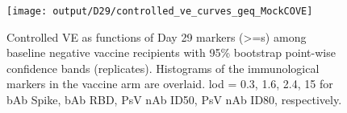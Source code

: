 \documentclass[
]{article}
\begin{document}
\begin{figure}[H]
    \centering
    \texttt{[image: output/D29/controlled\_ve\_curves\_geq\_MockCOVE]}
    \caption{Controlled VE as functions of Day 29 markers (>=s) among baseline negative vaccine recipients with 95\% bootstrap point-wise confidence bands (\protect replicates). Histograms of the immunological markers in the vaccine arm are overlaid. lod = 0.3, 1.6, 2.4, 15 for bAb Spike, bAb RBD, PsV nAb ID50, PsV nAb ID80, respectively.}
\end{figure}

  
\end{document}

